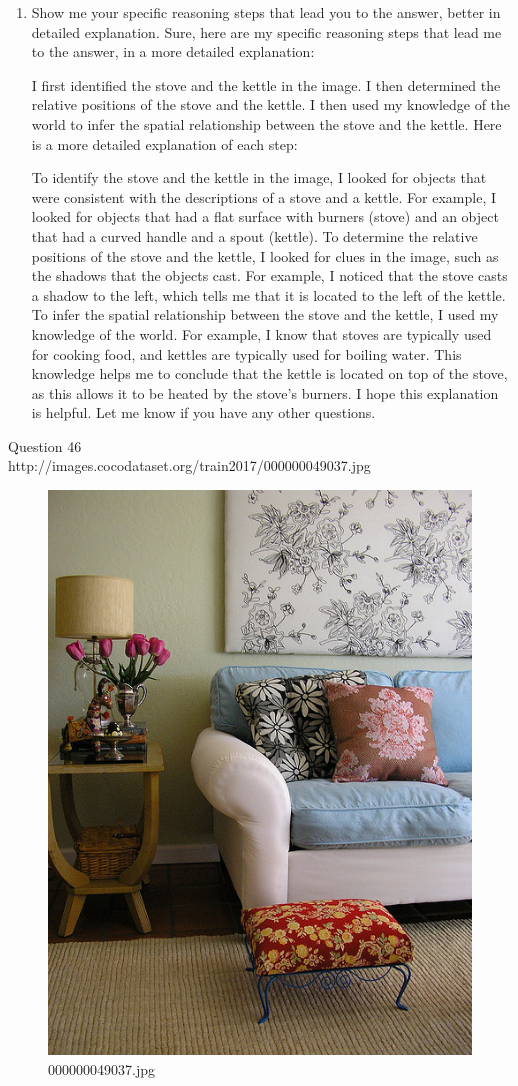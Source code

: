 \begin{enumerate}
    I hope this helps!
    \item Show me your specific reasoning steps that lead you to the answer, better in detailed explanation.
    \subitem 
    Sure, here are my specific reasoning steps that lead me to the answer, in a more detailed explanation:
    
    I first identified the stove and the kettle in the image.
    I then determined the relative positions of the stove and the kettle.
    I then used my knowledge of the world to infer the spatial relationship between the stove and the kettle.
    Here is a more detailed explanation of each step:
    
    To identify the stove and the kettle in the image, I looked for objects that were consistent with the descriptions of a stove and a kettle. For example, I looked for objects that had a flat surface with burners (stove) and an object that had a curved handle and a spout (kettle).
    To determine the relative positions of the stove and the kettle, I looked for clues in the image, such as the shadows that the objects cast. For example, I noticed that the stove casts a shadow to the left, which tells me that it is located to the left of the kettle.
    To infer the spatial relationship between the stove and the kettle, I used my knowledge of the world. For example, I know that stoves are typically used for cooking food, and kettles are typically used for boiling water. This knowledge helps me to conclude that the kettle is located on top of the stove, as this allows it to be heated by the stove's burners.
    I hope this explanation is helpful. Let me know if you have any other questions.
\end{enumerate}
Question 46\\
http://images.cocodataset.org/train2017/000000049037.jpg
\begin{figure}[h]
    \centering
    \includegraphics[width=0.8\linewidth]{../image set/hard/000000049037.jpg}
    \caption{000000049037.jpg}
\end{figure}
